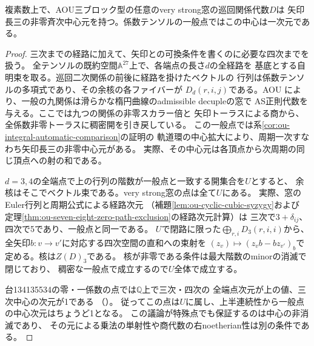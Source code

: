 \begin{proposition}[全AOU窓における三次中心の非消滅]
\label{prop:ou-aou-central-specialization}
複素数上で、AOU三ブロック型の任意のvery strong窓の巡回関係代数$D$は
矢印長三の非零斉次中心元を持つ。係数テンソルの一般点ではこの中心は一次元である。
\end{proposition}
\begin{proof}
三次までの経路に加えて、矢印との可換条件を書くのに必要な四次までを扱う。
全テンソルの既約空間$\mathbb A^{27}$上で、各端点の長さ$d$の全経路を
基底とする自明束を取る。巡回二次関係の前後に経路を掛けたベクトルの
行列は係数テンソルの多項式であり、その余核の各ファイバーが
$D_d(r,i,j)$である。AOU\cite[Theorem~1.1, Lemma~7.4, Corollary~7.8]{AOU2024}
により、一般の九関係は滑らかな楕円曲線のadmissible decupleの窓で
AS正則代数を与える。ここでは九つの関係の非零スカラー倍と
矢印トーラスによる商から、全係数非零トーラスに稠密開を引き戻している。
この一般点では系\ref{cor:ou-integral-automatic-comparison}の証明の
軌道環の中心拡大により、周期一次すなわち矢印長三の非零中心元がある。
実際、その中心元は各頂点から次周期の同じ頂点への射の和である。

$d=3,4$の全端点で上の行列の階数が一般点と一致する開集合を$U$とすると、
余核はそこでベクトル束である。very strong窓の点は全て$U$にある。
実際、窓のEuler行列と周期公式による経路次元
（補題\ref{lem:ou-cyclic-cubic-syzygy}および
定理\ref{thm:ou-seven-eight-zero-path-exclusion}の経路次元計算）は
三次で$3+\delta_{ij}$、四次で5であり、一般点と同一である。
$U$で閉路に限った$\bigoplus_{r,i}D_3(r,i,i)$から、
全矢印$b:v\to v'$に対応する四次空間の直和への束射を
$(z_v)\mapsto(z_v b-bz_{v'})_b$で定める。核は$Z(D)_3$である。
核が非零である条件は最大階数のminorの消滅で閉じており、
稠密な一般点で成立するので$U$全体で成立する。

台134135534の零・一係数の点では$\mathbb Q$上で三次・四次の
全端点次元が上の値、三次中心の次元が1である
（）。
従ってこの点は$U$に属し、上半連続性から一般点の中心次元はちょうど1となる。
この議論が特殊点でも保証するのは中心の非消滅であり、
その元による乗法の単射性や商代数の右noetherian性は別の条件である。
\end{proof}

